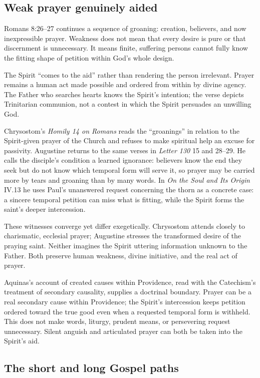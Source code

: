 \subsection*{Weak prayer genuinely aided\enspace{}}

Romans 8:26--27 continues a sequence of groaning: creation, believers, and now inexpressible prayer. Weakness does not mean that every desire is pure or that discernment is unnecessary. It means finite, suffering persons cannot fully know the fitting shape of petition within God's whole design.

The Spirit “comes to the aid” rather than rendering the person irrelevant. Prayer remains a human act made possible and ordered from within by divine agency. The Father who searches hearts knows the Spirit's intention; the verse depicts Trinitarian communion, not a contest in which the Spirit persuades an unwilling God.

Chrysostom's \emph{Homily 14 on Romans} reads the “groanings” in relation to the Spirit-given prayer of the Church and refuses to make spiritual help an excuse for passivity. Augustine returns to the same verses in \emph{Letter 130} 15 and 28--29. He calls the disciple's condition a learned ignorance: believers know the end they seek but do not know which temporal form will serve it, so prayer may be carried more by tears and groaning than by many words. In \emph{On the Soul and Its Origin} IV.13 he uses Paul's unanswered request concerning the thorn as a concrete case: a sincere temporal petition can miss what is fitting, while the Spirit forms the saint's deeper intercession.

These witnesses converge yet differ exegetically. Chrysostom attends closely to charismatic, ecclesial prayer; Augustine stresses the transformed desire of the praying saint. Neither imagines the Spirit uttering information unknown to the Father. Both preserve human weakness, divine initiative, and the real act of prayer.

Aquinas's account of created causes within Providence, read with the Catechism's treatment of secondary causality, supplies a doctrinal boundary. Prayer can be a real secondary cause within Providence; the Spirit's intercession keeps petition ordered toward the true good even when a requested temporal form is withheld. This does not make words, liturgy, prudent means, or persevering request unnecessary. Silent anguish and articulated prayer can both be taken into the Spirit's aid.

\subsection*{The short and long Gospel paths\enspace{}}

